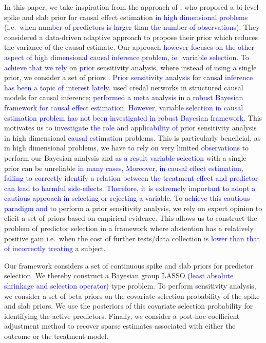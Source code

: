 \documentclass[preprint,12pt]{elsarticle}
\newcommand{\added}[1]{\textcolor{blue}{#1}}
\begin{document}
In this paper, we take inspiration from the approach of \citet{koch2020}, who proposed a bi-level spike and slab prior for causal effect estimation \added{in high dimensional problems (i.e.~when number of predictors
	is larger than the number of observations)}. 
	They considered a data-driven adaptive approach to
propose their prior which reduces the variance of the causal estimate. 
Our approach \added{however focuses on the other aspect of high
dimensional causal inference problem, ie.~variable selection. To achieve that we rely} on \added{prior}
sensitivity analysis, where instead of using a single prior, 
we consider a set of priors \citep{BERGER1990303}. 
\added{Prior sensitivity analysis for causal inference has
been a topic of interest lately.} \citet{zaffalon20a} 
used credal networks in structured causal models
for causal inference; \citet{raices_cruz22} \added{performed 
	a meta analysis in a robust Bayesian framework for causal effect estimation. However, variable selection in causal estimation
	problem has not been investigated in robust Bayesian framework.} 
This motivates us to \added{investigate the role and applicability of} prior sensitivity analysis in high dimensional \added{causal estimation} problems. This is particularly beneficial, as
in high dimensional problems,
we have to rely on very limited \added{observations} to perform our Bayesian analysis and
\added{as a result variable selection} with a single prior
can be unreliable \citep{basu2023robust} \added{in many cases, Moreover, in causal effect estimation, failing to correctly identify a relation between the treatment effect and predictor can lead to
harmful side-effects. Therefore, it
is extremely important to adopt a cautious approach in selecting
or rejecting a variable.}
To \added{achieve this cautious paradigm and to} perform a prior sensitivity analysis, we rely on expert opinion to elicit a set of priors 
based on empirical evidence. 
This allows us to construct the problem of 
predictor selection
in a framework where abstention has a relatively positive gain i.e.~when the cost of further tests/data collection is
\added{lower than that of incorrectly treating} a subject. 

Our framework considers a set of continuous spike and slab priors 
\citep{ishwaran2005} for
predictor selection.
We thereby construct a Bayesian group LASSO \added{(least absolute shrinkage and selection operator)} \citep{xu2015} type problem.
To perform sensitivity analysis,
we consider a set of beta priors on the covariate selection 
probability of the spike and slab priors. We use the posteriors of this
covariate selection probability for identifying the active predictors. Finally, 
we consider a post-hoc coefficient adjustment method \citep{hahn2015}
to recover sparse estimates associated with either the outcome or the
treatment model. 
\end{document}
